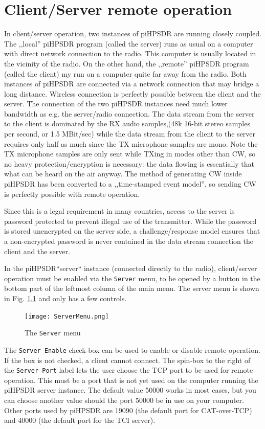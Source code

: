 \documentclass[12pt]{book}
\def\rett#1{\texttt{\color{red}#1}}
\def\bltt#1{\texttt{\color{blue}#1}}
\def\pH{pi\-HPSDR\xspace}
\begin{document}
\chapter{Client/Server remote operation}
\label{sec:clientserver}

In client/server operation, two instances of \pH are running closely coupled. The ,,local'' \pH program
(called the server) runs as usual on a computer with direct network connection to the radio. This computer is usually located
in the vicinity of the radio. On the other hand, the ,,remote'' \pH program (called the client) my run
on a computer quite far away from the radio. Both instances of \pH are connected via a network connection
that may bridge a long distance. Wireless connection is perfectly possible between the client and the server.
The connection of the two \pH instances need much lower bandwidth as e.g. the server/radio connection.
The data stream from the server to the client is dominated by the RX audio samples,(48k 16-bit
stereo samples per second, or  1.5 MBit/sec) while the data stream from the client to the server requires
only half as much since the TX microphone samples are mono. Note the TX microphone samples are only sent
while TXing in modes other than CW, so no heavy protection/encryption is necessary: the data flowing is
essentially that what can be heard on the air anyway. The method of generating CW inside \pH has been
converted to a ,,time-stamped event model'', so sending CW is perfectly possible with remote operation.

Since this is a legal requirement in many countries, access to the server is password protected to prevent
illegal use of the transmitter. While the password is stored unencrypted on the server side, a challenge/response
model ensures that a non-encrypted password is never contained in the data stream connection the client and
the server.

In the \pH ``server`` instance (connected directly to the radio), client/server operation must be enabled
via the \bltt{Server} menu, to be opened by a button in the bottom  part of the leftmost  column of the  main menu.
The server menu is shown in Fig. \ref{fig:servermenu} and only has a few controls.

\begin{figure}[ht]
\center
\texttt{[image: ServerMenu.png]}
\caption{The \bltt{Server} menu}
\label{fig:servermenu}
\end{figure}

The \rett{Server Enable} check-box can be used to enable or disable remote operation. If the box is not
checked, a client cannot connect. The  spin-box  to the right of the \rett{Server Port} label lets the user
choose the TCP port to be  used for remote operation. This must be a port that is not yet used on the
computer running the \pH server instance. The default value 50000 works in most cases, but you can choose
another value should the port 50000 be in use on your computer. Other ports used by \pH are 19090 (the default
port for CAT-over-TCP) and 40000 (the default port for the TCI server).
\end{document}
